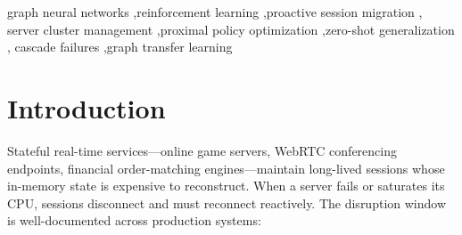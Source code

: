 \documentclass[review,1p]{elsarticle}
\theoremstyle{definition}
\begin{document}
\begin{frontmatter}
\begin{abstract}
We also report a negative ablation finding that sharpens where the gain comes
from: across three failure regimes---i.i.d., weakly cascade-correlated, and
strongly cascade-correlated failures---an edge-free GNN trained from scratch
matches or exceeds the full GNN ($p{=}0.78$, $0.80$, and $0.56$ respectively),
showing that the advantage over a flat MLP stems from the shared per-node
encoder (permutation equivariance) rather than from relational message passing.
ProactiveHop therefore demonstrates that a graph-structured RL policy is a
practical \emph{size- and topology-agnostic} controller for proactive session
continuity in real-time clusters: one trained model can be deployed to
clusters whose scale and wiring it never saw during training.
\end{abstract}

\begin{keyword}
graph neural networks \sep reinforcement learning \sep proactive session migration \sep
server cluster management \sep proximal policy optimization \sep zero-shot generalization \sep
cascade failures \sep graph transfer learning
\end{keyword}

\end{frontmatter}

\section{Introduction}
\label{sec:intro}

Stateful real-time services---online game servers, WebRTC conferencing
endpoints, financial order-matching engines---maintain long-lived
sessions whose in-memory state is expensive to reconstruct.
When a server fails or saturates its CPU, sessions disconnect and must
reconnect reactively.  The disruption window is well-documented across
production systems:
\end{document}
